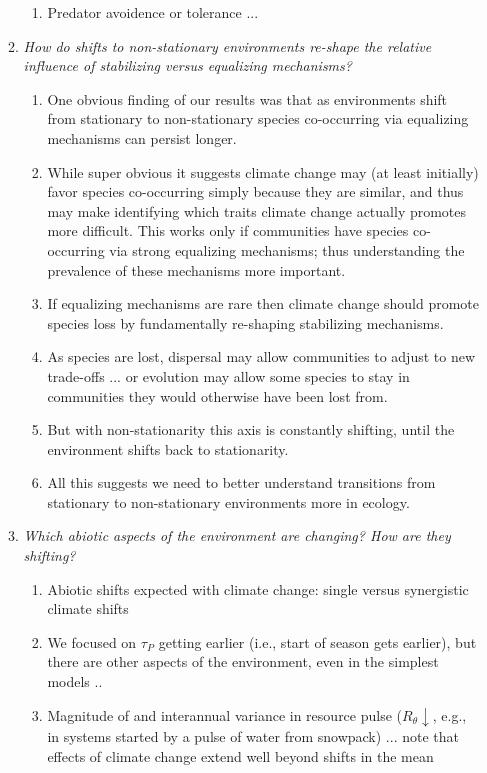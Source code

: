 \documentclass[11pt,letterpaper]{article}
\begin{document}
\begin{enumerate}
\begin{enumerate}
\begin{enumerate}
\item Predator avoidence or tolerance ...
\end{enumerate}
\item \emph{How do shifts to non-stationary environments re-shape the relative influence of stabilizing versus equalizing mechanisms? }
\begin{enumerate}
\item One obvious finding of our results was that as environments shift from stationary to non-stationary species co-occurring via equalizing mechanisms can persist longer. 
\item While super obvious it suggests climate change may (at least initially) favor species co-occurring simply because they are similar, and thus may make identifying which traits climate change actually promotes more difficult. This works only if communities have species co-occurring via strong equalizing mechanisms; thus understanding the prevalence of these mechanisms more important.
\item If equalizing mechanisms are rare then climate change should promote species loss by fundamentally re-shaping stabilizing mechanisms.
\item As species are lost, dispersal may allow communities to adjust to new trade-offs ... or evolution may allow some species to stay in communities they would otherwise have been lost from.
\item But with non-stationarity this axis is constantly shifting, until the environment shifts back to stationarity. 
\item All this suggests we need to better understand transitions from stationary to non-stationary environments more in ecology. 
\end{enumerate}
\item \emph{Which abiotic aspects of the environment are changing? How are they shifting?} 
\begin{enumerate}
\item Abiotic shifts expected with climate change: single versus synergistic climate shifts
\item We focused on $\tau_{P}$ getting earlier (i.e., start of season gets earlier), but there are other aspects of the environment, even in the simplest models ..
\item Magnitude of and interannual variance in resource pulse ($R_{\theta} \downarrow$, e.g., in systems started by a pulse of water from snowpack) ... note that effects of climate change extend well beyond shifts in the mean

\end{enumerate}
\end{enumerate}
\end{enumerate}
\end{document}
